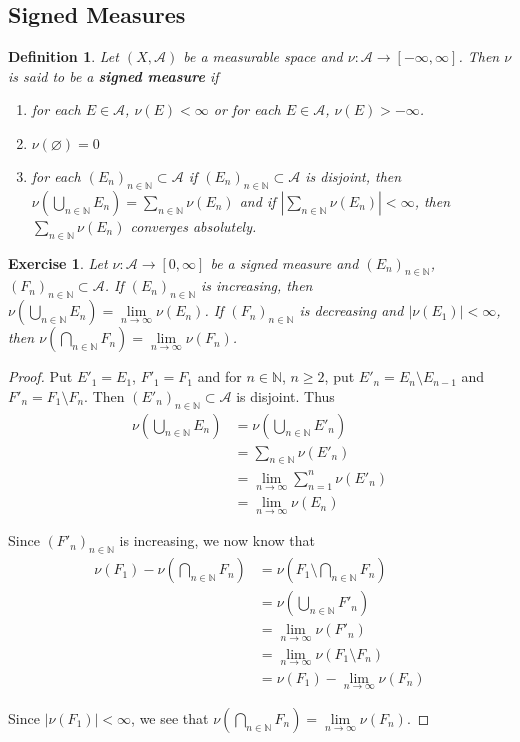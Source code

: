 \documentclass[12pt]{amsart}
\newtheorem{defn}[thm]{Definition}
\newtheorem{ex}[thm]{Exercise}
\newcommand{\N}{\mathbb{N}}
\newcommand{\MA}{\mathcal{A}}
\newcommand{\RG}{[0,\infty]}
\newcommand{\limn}{\lim \limits_{n \rightarrow \infty}}
\begin{document}
\subsection{Signed Measures}

\begin{defn}
Let $(X, \MA)$ be a measurable space and $\nu : \MA \rightarrow [-\infty, \infty]$. Then $\nu$ is said to be a \textbf{signed measure} if 
\begin{enumerate}
\item for each $E \in \MA$, $\nu(E) < \infty$ or for each $E \in \MA$, $\nu(E) > -\infty$.
\item $\nu(\varnothing) = 0$
\item for each $(E_n)_{n \in \N} \subset \MA$ if $(E_n)_{n \in \N} \subset \MA$ is disjoint, then $\nu(\bigcup\limits_{n \in \N} E_n) = \sum\limits_{n \in \N} \nu(E_n)$ and if $|\sum\limits_{n \in \N} \nu(E_n)| < \infty$, then $\sum\limits_{n \in \N} \nu(E_n)$ converges absolutely.
\end{enumerate}
\end{defn}

\begin{ex}
Let $\nu: \MA \rightarrow \RG$ be a signed measure and $(E_n)_{n \in \N}$, $(F_n)_{n \in \N} \subset \MA$. If $(E_n)_{n \in \N}$ is increasing, then $\nu(\bigcup\limits_{n \in \N} E_n) = \limn \nu(E_n)$. If $(F_n)_{n \in \N}$ is decreasing and $|\nu(E_1)| < \infty$, then $\nu(\bigcap\limits_{n \in \N} F_n) = \limn \nu(F_n)$. 
\end{ex}

\begin{proof}
Put $E'_1 = E_1$, $F'_1 = F_1$ and for $n \in \N$, $n \geq 2$, put $E'_n = E_n \setminus E_{n-1}$ and $F'_n = F_1 \setminus F_n$. Then $(E'_n)_{n \in \N} \subset \MA$ is disjoint. Thus 
\begin{align*}
\nu(\bigcup\limits_{n \in \N} E_n) 
&= \nu(\bigcup\limits_{n \in \N} E'_n)\\
&= \sum\limits_{n \in \N} \nu(E'_n)\\
&= \limn \sum_{n=1}^n \nu(E'_n)\\
&= \limn \nu(E_n)
\end{align*}

Since $(F'_n)_{n \in \N}$ is increasing, we now know that 
\begin{align*}
\nu(F_1) - \nu(\bigcap\limits_{n \in \N} F_n)
&= \nu(F_1 \setminus \bigcap\limits_{n \in \N} F_n)\\
&= \nu(\bigcup\limits_{n \in \N} F'_n) \\
&= \limn \nu(F'_n) \\
&= \limn \nu(F_1 \setminus F_n) \\ 
&= \nu(F_1) - \limn \nu(F_n)
\end{align*}

Since $|\nu(F_1)| < \infty$, we see that $\nu(\bigcap\limits_{n \in \N} F_n) = \limn \nu(F_n)$.
\end{proof}
\end{document}
